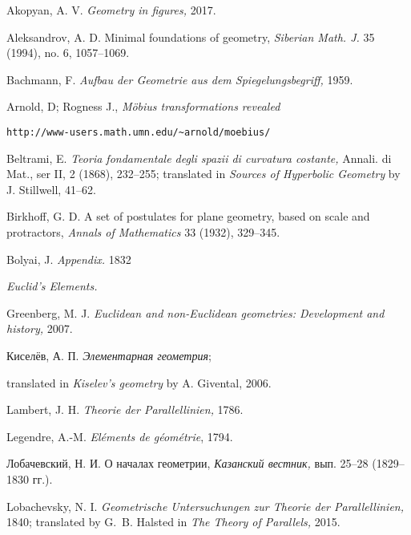 \renewcommand{\bibname}{Used resources}
\begin{thebibliography}{52}

Akopyan, A. V. 
\textit{Geometry in figures,} 2017.


Aleksandrov, A. D.
Minimal foundations of geometry,
\textit{Siberian Math. J.} 35 (1994), no. 6, 1057--1069.

 Bachmann, F.
\textit{Aufbau der Geometrie aus dem Spiegelungsbegriff,} 1959. 

 Arnold, D; Rogness J., \textit{M\"obius transformations revealed}
\begin{verbatim}http://www-users.math.umn.edu/~arnold/moebius/\end{verbatim}


  Beltrami, E.
\textit{Teoria fondamentale degli spazii di curvatura costante,} 
Annali. di Mat., ser II, 2 (1868), 232--255;
translated in \textit{Sources of Hyperbolic Geometry} by J. Stillwell,  41--62.

Birkhoff, G. D.
A set of postulates for plane geometry,
based on scale and protractors, 
\textit{Annals of Mathematics} 33 (1932), 329--345.

 Bolyai, J. \textit{Appendix.} 1832

\textit{Euclid's Elements.}

Greenberg, M. J.
\textit{Euclidean and non-Euclidean geometries: Development and history,} 2007.

\begin{otherlanguage}{russian}
Киселёв, А. П. 
\textit{Элементарная геометрия};
\end{otherlanguage}
translated in 
\textit{Kiselev's geometry} by A. Givental, 2006.



Lambert, J. H.
\textit{Theorie der Parallellinien,}
1786.

Legendre, A.-M.
\textit{El\'ements de g\'eom\'etrie}, 1794.

\begin{otherlanguage}{russian}
Лобачевский, Н. И.  
О началах геометрии, 
\textit{Казанский вестник,} вып. 25--28 (1829--1830 гг.).
\end{otherlanguage}

Lobachevsky, N. I.
\textit{Geometrische Untersuchungen zur Theorie der Parallellinien,} 1840;
translated by G.~B. Halsted in \textit{The Theory of Parallels,} 2015.




\end{thebibliography}

